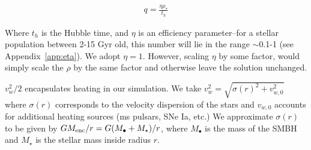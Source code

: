 \documentclass[usenatbib,fleqn]{mn2e}
\newcommand{\vw}{v_w}
\newcommand{\Menc}{M_{\rm enc}}
\newcommand{\Mstar}{M_{\star}}
\newcommand{\Mbh}[1][]{M_{\bullet#1}}
\begin{document}
\begin{align}
q=\frac{\eta \rho_*}{t_h}
\end{align}

Where $t_h$ is the Hubble time, and $\eta$ is an efficiency parameter--for a stellar population between 2-15 Gyr old, this number will lie in the range $\sim$0.1-1 (see Appendix~\ref{app:eta}). We adopt $\eta=1$. However, scaling $\eta$ by some factor, would simply scale the $\rho$ by the same factor and otherwise leave the solution unchanged. 

$\vw^2/2$ encapsulates heating in our simulation. We take $\vw^2=\sqrt{\sigma(r)^2+v_{w,0}^2}$ where $\sigma(r)$ corresponds to the velocity dispersion of the stars and $v_{w,0}$ accounts for additional heating sources (ms pulsars, SNe Ia, etc.)  We approximate $\sigma(r)$ to be given by $G \Menc/r=G(\Mbh+\Mstar)/r$, where $\Mbh$ is the mass of the SMBH and $\Mstar$ is the stellar mass inside radius $r$. 

\end{document}
